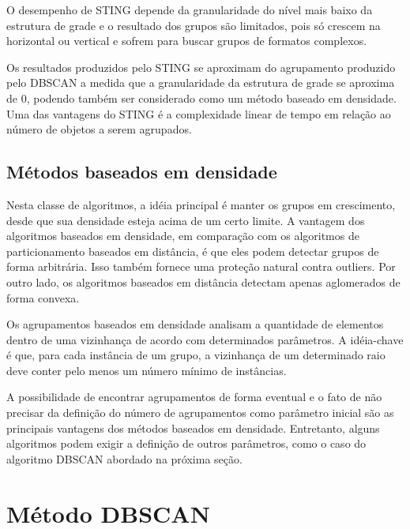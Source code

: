 O desempenho de STING depende da granularidade do nível mais baixo da estrutura de grade e o resultado dos
grupos são limitados, pois só crescem na horizontal ou vertical e sofrem para buscar grupos de formatos complexos.

Os resultados produzidos pelo STING se aproximam do agrupamento produzido pelo
DBSCAN a medida que a granularidade da estrutura de grade se aproxima de 0, podendo
também ser considerado como um método baseado em densidade.
Uma das vantagens do STING é a complexidade linear de tempo em relação ao número de objetos
a serem agrupados.

\subsection{Métodos baseados em densidade}
Nesta classe de algoritmos, a idéia principal é manter os grupos em crescimento, desde que sua densidade esteja acima de um certo limite. A vantagem dos algoritmos baseados em densidade, em comparação com os algoritmos de particionamento baseados em distância, é que eles podem detectar grupos de forma arbitrária. Isso também fornece uma proteção natural contra outliers. Por outro lado, os algoritmos baseados em distância detectam apenas aglomerados de forma convexa.

Os agrupamentos baseados em densidade analisam a quantidade de elementos dentro de uma vizinhança de acordo com determinados parâmetros. A idéia-chave é que, para cada instância de um grupo, a vizinhança de um determinado raio deve conter pelo menos um número mínimo de instâncias.

A possibilidade de encontrar agrupamentos de forma eventual e o fato de não precisar da definição do número de agrupamentos \cite{yip2005} como parâmetro inicial são as principais vantagens dos métodos baseados em densidade. Entretanto, alguns algoritmos podem exigir a definição de outros parâmetros, como o caso do algoritmo DBSCAN \cite{ESTER1996} abordado na próxima seção.

\section{Método DBSCAN}
\label{dbscan}

